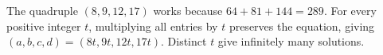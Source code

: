 The quadruple $(8,9,12,17)$ works because $ 64+81+144=289 $. For every positive integer $ t $, multiplying all entries by $ t $ preserves the equation, giving $\boxed{(a,b,c,d)=(8t,9t,12t,17t)}$. Distinct $ t $ give infinitely many solutions.
